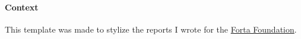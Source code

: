 \paragraph{Context} \label{sec:context}

This template was made to stylize the reports I wrote for the \href{https://forta.org/}{Forta Foundation}.
